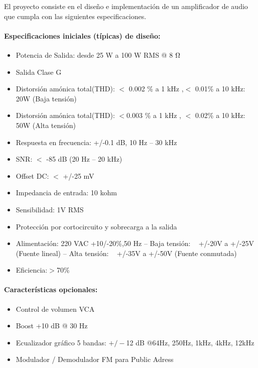 \bigskip
El proyecto consiste en el diseño e implementación de un amplificador de audio que cumpla con las siguientes especificaciones.

\medskip 
\paragraph{Especificaciones iniciales (típicas) de diseño:}

\begin{itemize}
\item Potencia de Salida: desde 25 W a 100 W RMS @ 8 $\ohm$

\item Salida Clase G

\item  Distorsión amónica total(THD): $<$ 0.002 \% a 1 kHz ,$<$ 0.01\% a 10 kHz: 20W (Baja tensión)
\item  Distorsión amónica total(THD): $<$0.003 \% a 1 kHz , $<$ 0.02\% a 10 kHz: 50W (Alta tensión)
\item Respuesta en frecuencia: +/-0.1 dB, 10 Hz – 30 kHz
\item SNR: $<$ -85 dB (20 Hz – 20 kHz)
\item Offset DC: $<$ +/-25 mV
\item Impedancia de entrada: 10 kohm
\item Sensibilidad: 1V RMS
\item Protección por cortocircuito y sobrecarga a la salida
\item Alimentación: 220 VAC +10/-20\%,50 Hz
    – Baja tensión: ~ +/-20V a +/-25V (Fuente lineal)
    – Alta tensión: ~ +/-35V a +/-50V (Fuente conmutada)
\item  Eficiencia:$>$70\%

\end{itemize}
\medskip 
\paragraph*{Características opcionales:}

\begin{itemize}
\item  Control de volumen VCA
\item  Boost +10 dB @ 30 Hz
\item  Ecualizador gráfico 5 bandas: $+/-$12 dB @64Hz, 250Hz, 1kHz, 4kHz, 12kHz
\item  Modulador / Demodulador FM para Public Adress

\end{itemize}